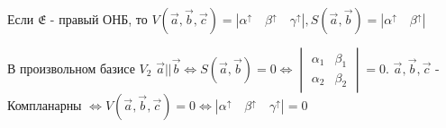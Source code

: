 \begin{corollary}
	Если \(\mathfrak{E}\) - правый ОНБ, то \(V(\vec{a}, \vec{b}, \vec{c}) = |\alpha^{\uparrow} \quad \beta^{\uparrow} \quad \gamma^{\uparrow}|, S(\vec{a}, \vec{b}) = |\alpha^{\uparrow} \quad \beta^{\uparrow}|\)
\end{corollary}
\begin{corollary}
	В произвольном базисе \(V_2\) \(\vec{a} || \vec{b} \Longleftrightarrow S(\vec{a}, \vec{b}) = 0 \Longleftrightarrow \begin{vmatrix}
		\alpha_1 & \beta_1 \\
		\alpha_2 & \beta_2
	\end{vmatrix} = 0\). \newline
	\(\vec{a}, \vec{b}, \vec{c}\) - Компланарны \(\Longleftrightarrow V(\vec{a}, \vec{b}, \vec{c}) = 0 \Longleftrightarrow |\alpha^{\uparrow} \quad \beta^{\uparrow} \quad \gamma^{\uparrow}| = 0\)
\end{corollary}
